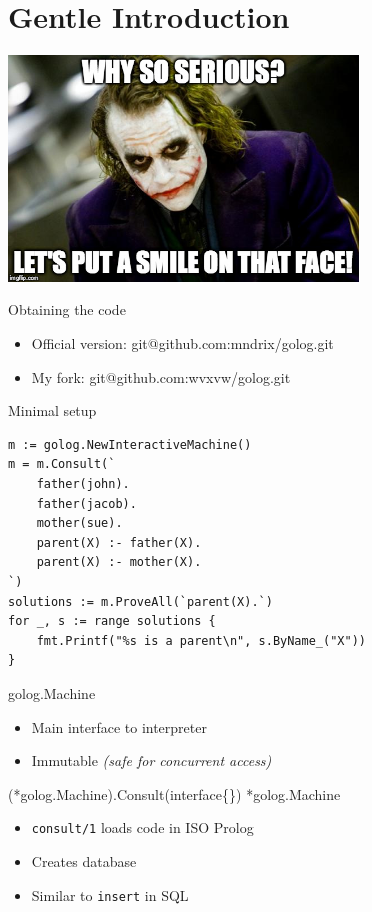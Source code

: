 \documentclass[presentation]{beamer}
\begin{document}
\section{Gentle Introduction}
\label{sec-3}
\includegraphics[height=6cm]{./images/serious.jpg}

\begin{frame}[label=sec-3-1]{Obtaining the code}
\begin{itemize}
\item Official version: git@github.com:mndrix/golog.git
\item My fork: git@github.com:wvxvw/golog.git
\end{itemize}
\end{frame}

\begin{frame}[fragile,label=sec-3-2]{Minimal setup}
 \begin{verbatim}
m := golog.NewInteractiveMachine()
m = m.Consult(`
    father(john).
    father(jacob).
    mother(sue).
    parent(X) :- father(X).
    parent(X) :- mother(X).
`)
solutions := m.ProveAll(`parent(X).`)
for _, s := range solutions {
    fmt.Printf("%s is a parent\n", s.ByName_("X"))
}
\end{verbatim}
\end{frame}

\begin{frame}[label=sec-3-3]{golog.Machine}
\begin{itemize}
\item Main interface to interpreter
\item Immutable \emph{(safe for concurrent access)}
\end{itemize}
\end{frame}

\begin{frame}[fragile,label=sec-3-4]{(*golog.Machine).Consult(interface\{\}) *golog.Machine}
 \begin{itemize}
\item \texttt{consult/1} loads code in ISO Prolog
\item Creates database
\item Similar to \texttt{insert} in SQL
\end{itemize}
\end{frame}
\end{document}
